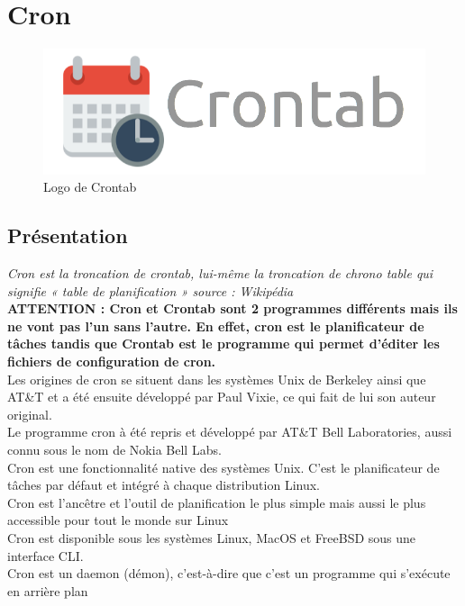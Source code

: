 \documentclass[12pt]{article}
\begin{document}
\newpage
\section{Cron}

\begin{figure}[ht]
    \includegraphics[scale=0.5]{images/crontab.png}
    \caption{Logo de Crontab}
\end{figure}

\subsection{Présentation}

\textit{Cron est la troncation de crontab, lui-même la troncation de chrono table qui signifie « table de planification » source : Wikipédia}
\vspace{0.5cm}
\\
\textbf{ATTENTION : Cron et Crontab sont 2 programmes différents mais ils ne vont pas l'un sans l'autre. En effet, cron est le planificateur de tâches tandis que Crontab est le programme qui permet d'éditer les fichiers de configuration de cron.}
\vspace{0.5cm}
\\
Les origines de cron se situent dans les systèmes Unix de Berkeley ainsi que AT\&T et a été ensuite développé par Paul Vixie, ce qui fait de lui son auteur original.
\\
Le programme cron à été repris et développé par AT\&T Bell Laboratories, aussi connu sous le nom de Nokia Bell Labs.
\\
Cron est une fonctionnalité native des systèmes Unix. C'est le planificateur de tâches par défaut et intégré à chaque distribution Linux.
\\
Cron est l’ancêtre et l'outil de  planification le plus simple mais aussi le plus accessible pour tout le monde sur Linux
\\
Cron est disponible sous les systèmes Linux, MacOS et FreeBSD sous une interface CLI.
\\
Cron est un daemon (démon), c'est-à-dire que c'est un programme qui s'exécute en arrière plan
\end{document}
